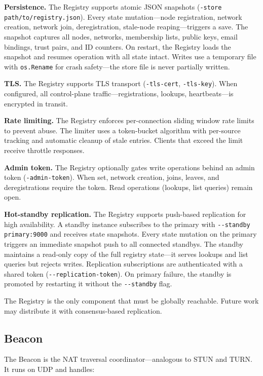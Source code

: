 \documentclass[11pt,a4paper]{article}
\begin{document}
\textbf{Persistence.} The Registry supports atomic JSON snapshots (\texttt{-store path/to/registry.json}). Every state mutation---node registration, network creation, network join, deregistration, stale-node reaping---triggers a save. The snapshot captures all nodes, networks, membership lists, public keys, email bindings, trust pairs, and ID counters. On restart, the Registry loads the snapshot and resumes operation with all state intact. Writes use a temporary file with \texttt{os.Rename} for crash safety---the store file is never partially written.

\textbf{TLS.} The Registry supports TLS transport (\texttt{-tls-cert}, \texttt{-tls-key}). When configured, all control-plane traffic---registrations, lookups, heartbeats---is encrypted in transit.

\textbf{Rate limiting.} The Registry enforces per-connection sliding window rate limits to prevent abuse. The limiter uses a token-bucket algorithm with per-source tracking and automatic cleanup of stale entries. Clients that exceed the limit receive throttle responses.

\textbf{Admin token.} The Registry optionally gates write operations behind an admin token (\texttt{-admin-token}). When set, network creation, joins, leaves, and deregistrations require the token. Read operations (lookups, list queries) remain open.

\textbf{Hot-standby replication.} The Registry supports push-based replication for high availability. A standby instance subscribes to the primary with \texttt{-{}-standby primary:9000} and receives state snapshots. Every state mutation on the primary triggers an immediate snapshot push to all connected standbys. The standby maintains a read-only copy of the full registry state---it serves lookups and list queries but rejects writes. Replication subscriptions are authenticated with a shared token (\texttt{-{}-replication-token}). On primary failure, the standby is promoted by restarting it without the \texttt{-{}-standby} flag.

The Registry is the only component that must be globally reachable. Future work may distribute it with consensus-based replication.

\subsection{Beacon}

The Beacon is the NAT traversal coordinator---analogous to STUN and TURN. It runs on UDP and handles:
\end{document}
